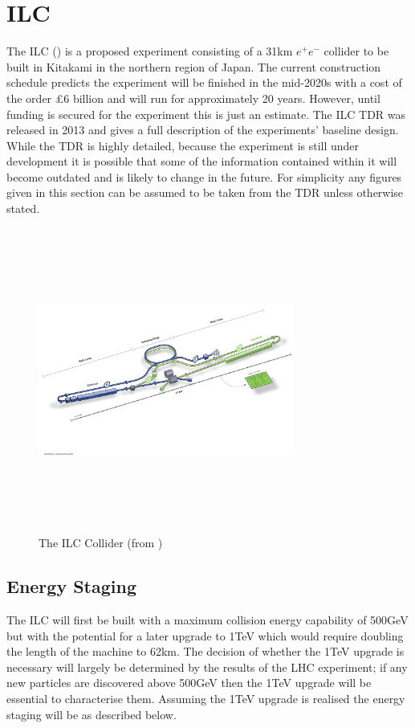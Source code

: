\section{ILC}

The ILC () is a proposed experiment consisting of a 31km ${e^+e^-}$ collider to be built in Kitakami in the northern region of Japan. The current construction schedule predicts the experiment will be finished in the mid-2020s with a cost of the order \pounds6 billion and will run for approximately 20 years. However, until funding is secured for the experiment this is just an estimate. The \ac{ILC} \ac{TDR} \cite{ILCTDR} was released in 2013 and gives a full description of the experiments' baseline design. While the \ac{TDR} is highly detailed, because the experiment is still under development it is possible that some of the information contained within it will become outdated and is likely to change in the future. For simplicity any figures given in this section can be assumed to be taken from the \ac{TDR} unless otherwise stated.

\begin{figure}
  \centering
  \includegraphics[width=0.75\textwidth,height=10cm,keepaspectratio]{fig/ILC}
  \caption[The ILC Experiment]{The \ac{ILC} Collider (from \cite{ILCTDR})}
  \label{Fig:ILC}
\end{figure}
\subsection{Energy Staging}
The \ac{ILC} will first be built with a maximum collision energy capability of 500GeV but with the potential for a later upgrade to 1TeV which would require doubling the length of the machine to 62km. The decision of whether the 1TeV upgrade is necessary will largely be determined by the results of the \ac{LHC} experiment; if any new particles are discovered above 500GeV then the 1TeV upgrade will be essential to characterise them. Assuming the 1TeV upgrade is realised the energy staging will be as described below.


